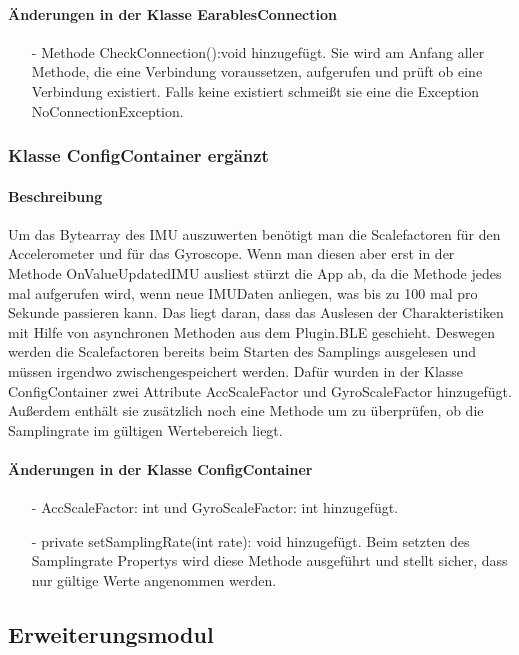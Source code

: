 \documentclass[a4paper,12pt]{article}
\begin{document}
\paragraph{Änderungen in der Klasse EarablesConnection}
\begin{itemize}
	\item[-] Methode CheckConnection():void hinzugefügt. Sie wird am Anfang aller  Methode, die eine Verbindung voraussetzen, aufgerufen und prüft ob eine Verbindung existiert. Falls keine existiert schmeißt sie eine die Exception NoConnectionException.
\end{itemize}

\subsubsection{Klasse ConfigContainer ergänzt}
\paragraph{Beschreibung}
Um das Bytearray des IMU auszuwerten benötigt man die Scalefactoren für den Accelerometer und für das Gyroscope. Wenn man diesen aber erst in der Methode OnValueUpdatedIMU ausliest stürzt die App ab, da die Methode jedes mal aufgerufen wird, wenn neue IMUDaten anliegen, was bis zu 100 mal pro Sekunde passieren kann. Das liegt daran, dass das Auslesen der Charakteristiken mit Hilfe von asynchronen Methoden aus dem Plugin.BLE geschieht. Deswegen werden die Scalefactoren bereits beim Starten des Samplings ausgelesen und müssen irgendwo zwischengespeichert werden. Dafür wurden in der Klasse ConfigContainer zwei Attribute AccScaleFactor und GyroScaleFactor hinzugefügt. Außerdem enthält sie zusätzlich noch eine Methode um zu überprüfen, ob die Samplingrate im gültigen Wertebereich liegt.
\paragraph{Änderungen in der Klasse ConfigContainer}
\begin{itemize}
	\item[-] AccScaleFactor: int und GyroScaleFactor: int hinzugefügt.
	\item[-] private setSamplingRate(int rate): void hinzugefügt. Beim setzten des Samplingrate Propertys wird diese Methode ausgeführt und stellt sicher, dass nur gültige Werte angenommen werden.
\end{itemize}

\subsection{Erweiterungsmodul}
\end{document}
